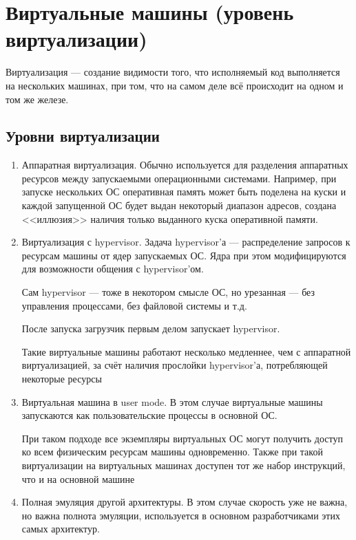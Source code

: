 \section{Виртуальные машины (уровень виртуализации)}

Виртуализация --- создание видимости того, что исполняемый код выполняется на нескольких машинах, при том, что на самом деле всё происходит на одном и том же железе.

\subsection{Уровни виртуализации}

\begin{enumerate}
\item Аппаратная виртуализация. Обычно используется для разделения аппаратных ресурсов между запускаемыми операционными системами. Например, при запуске нескольких ОС оперативная память может быть поделена на куски и каждой запущенной ОС будет выдан некоторый диапазон адресов, создана <<иллюзия>> наличия только выданного куска оперативной памяти.
\item Виртуализация с hypervisor. Задача hypervisor'а --- распределение запросов к ресурсам машины от ядер запускаемых ОС. Ядра при этом модифицируются для возможности общения с hypervisor'ом.

Сам  hypervisor --- тоже в некотором смысле ОС, но урезанная --- без управления процессами, без файловой системы и т.д.

После запуска загрузчик первым делом запускает hypervisor.

Такие виртуальные машины работают несколько медленнее, чем с аппаратной виртуализацией, за счёт наличия прослойки hypervisor'а, потребляющей некоторые ресурсы

\item Виртуальная машина в user mode. В этом случае виртуальные машины запускаются как пользовательские процессы в основной ОС.

При таком подходе все экземпляры виртуальных ОС могут получить доступ ко всем физическим ресурсам машины одновременно. Также при такой виртуализации на виртуальных машинах доступен тот же набор инструкций, что и на основной машине

\item Полная эмуляция другой архитектуры. В этом случае скорость уже не важна, но важна полнота эмуляции, используется в основном разработчиками этих самых архитектур.

\end{enumerate}

